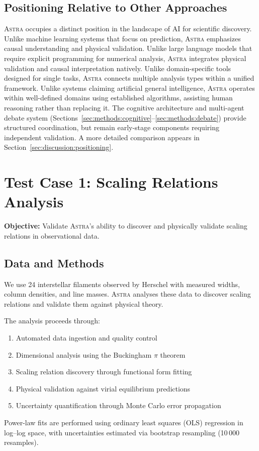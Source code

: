 \documentclass[usenatbib]{rasti}
\newcommand{\astra}{\textsc{Astra}\xspace}
\begin{document}
\subsection{Positioning Relative to Other Approaches}
\label{sec:methods:positioning}

\astra occupies a distinct position in the landscape of AI for scientific discovery.
Unlike machine learning systems that focus on prediction, \astra emphasizes causal understanding and physical validation.
Unlike large language models that require explicit programming for numerical analysis, \astra integrates physical validation and causal interpretation natively.
Unlike domain-specific tools designed for single tasks, \astra connects multiple analysis types within a unified framework.
Unlike systems claiming artificial general intelligence, \astra operates within well-defined domains using established algorithms, assisting human reasoning rather than replacing it.
The cognitive architecture and multi-agent debate system (Sections~\ref{sec:methods:cognitive}--\ref{sec:methods:debate}) provide structured coordination, but remain early-stage components requiring independent validation.
A more detailed comparison appears in Section~\ref{sec:discussion:positioning}.

\section{Test Case 1: Scaling Relations Analysis}
\label{sec:tc1}

\textbf{Objective:} Validate \astra's ability to discover and physically validate scaling relations in observational data.

\subsection{Data and Methods}
\label{sec:tc1:data}

We use 24 interstellar filaments observed by Herschel \citep{Arzoumanian2011,Arzoumanian2019} with measured widths, column densities, and line masses.
\astra analyses these data to discover scaling relations and validate them against physical theory.

The analysis proceeds through:
\begin{enumerate}
  \item[(i)] Automated data ingestion and quality control
  \item[(ii)] Dimensional analysis using the Buckingham $\pi$ theorem \citep{Buckingham1914}
  \item[(iii)] Scaling relation discovery through functional form fitting
  \item[(iv)] Physical validation against virial equilibrium predictions
  \item[(v)] Uncertainty quantification through Monte Carlo error propagation
\end{enumerate}
Power-law fits are performed using ordinary least squares (OLS) regression in log--log space, with uncertainties estimated via bootstrap resampling (10\,000 resamples).
\end{document}
